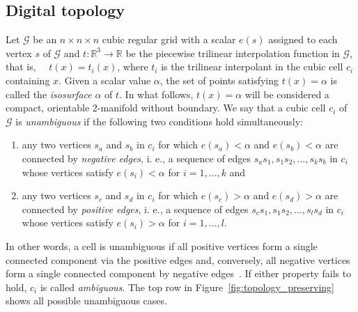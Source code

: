 \subsection{Digital topology}
\label{sec:digital-topology}

Let $\mathcal{G}$ be an $n\times n \times n$ cubic regular grid with a
scalar $e(s)$ assigned to each vertex $s$ of $\mathcal{G}$ and
$t:\mathbb{R}^3\rightarrow\mathbb{R}$ be the piecewise trilinear
interpolation function in $\mathcal{G}$, that is, ~~$t(x) = t_i(x)$,
where $t_i$ is the trilinear interpolant in the cubic cell $c_i$
containing $x$.
%
Given a scalar value $\alpha$, the set of points satisfying
$t(x)=\alpha$ is called the \emph{isosurface} $\alpha$ of $t$. In what
follows, $t(x)=\alpha$ will be considered a compact, orientable
2-manifold without boundary.
We say that a cubic cell $c_i$ of $\mathcal{G}$ is \emph{unambiguous}
if the following two conditions hold simultaneously:
\begin{enumerate}
\item any two vertices $s_a$ and $s_b$ in $c_i$ for which
  $e(s_a)<\alpha$ and $ e(s_b)<\alpha$ are connected by \emph{negative
  edges}, i. e., a sequence of edges $s_as_1,s_1s_2,\ldots,s_ks_b$ in
  $c_i$ whose vertices satisfy $e(s_i)<\alpha$ for $i=1,\ldots, k$ and
\item any two vertices $s_c$ and $s_d$ in $c_i$ for which
  $e(s_c)>\alpha$ and $e(s_d)>\alpha$ are connected by \emph{positive
  edges}, i. e., a sequence of edges $s_cs_1,s_1s_2,\ldots,s_ls_d$ in
  $c_i$ whose vertices satisfy $e(s_i)>\alpha$ for $i=1,\ldots,l$.
\end{enumerate}
 In other words, a cell is unambiguous if all positive vertices form a
 single connected component via the positive edges and, conversely, all
 negative vertices form a single connected component by negative
 edges~\cite{gelder:tog:1994}.  If either property fails to hold, $c_i$ is called \emph{ambiguous}. The top
 row in Figure~\ref{fig:topology_preserving} shows all possible
 unambiguous cases.

